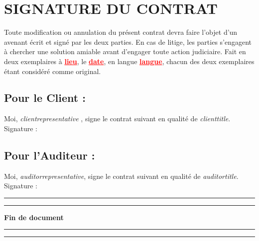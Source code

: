 \documentclass[12pt]{extarticle}
\begin{document}
\chapter{SIGNATURE DU CONTRAT}
Toute modification ou annulation du présent contrat devra faire l'objet d'un avenant écrit et signé par les deux parties. En cas de litige, les parties s'engagent à chercher une solution amiable avant d'engager toute action judiciaire.
Fait en deux exemplaires à \textcolor{red}{\textbf{\underline{lieu}}}, le \textcolor{red}{\textbf{\underline{date}}}, en langue \textcolor{red}{\textbf{\underline{langue}}}, chacun des deux exemplaires étant considéré comme original.
\section{Pour le Client :}
Moi, \textit{ {{clientrepresentative}} }, signe le contrat suivant en qualité de \textit{ {{clienttitle}}}.
\vspace{3cm}
Signature :
\section{Pour l'Auditeur :}
Moi, \textit{ {{auditorrepresentative}}}, signe le contrat suivant en qualité de \textit{ {{auditortitle}}}.
\vspace{3cm}
Signature :
\noindent\rule{\textwidth}{0.4pt}
\vspace{1cm}
\noindent\rule{\textwidth}{0.4pt}
\begin{center}
    \Huge\textbf{Fin de document}
\end{center}
\vspace{1cm}
\noindent\rule{\textwidth}{0.4pt}
\vspace{1cm}
\noindent\rule{\textwidth}{0.4pt}
\end{document}
